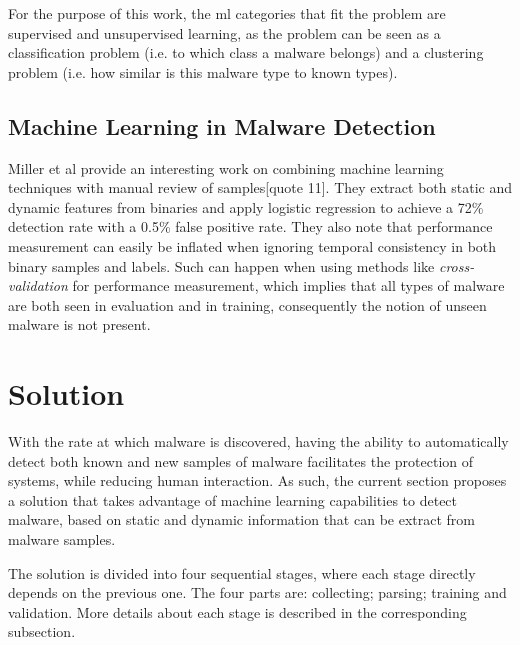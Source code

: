 \documentclass{llncs}
\begin{document}
For the purpose of this work, the \gls{ml} categories that fit the problem are supervised and unsupervised learning, as the problem can be seen as a classification problem (i.e. to which class a malware belongs) and a clustering problem (i.e. how similar is this malware type to known types).

\clearpage

\subsection{Machine Learning in Malware Detection}


Miller et al provide an interesting work on combining machine learning techniques with manual review of samples[quote 11]. They extract both static and dynamic features from binaries and apply logistic regression to achieve a 72\% detection rate with a 0.5\% false positive rate. They also note that performance measurement can easily be inflated when ignoring temporal consistency in both binary samples and labels. Such can happen when using methods like \textit{cross-validation} for performance measurement, which implies that all types of malware are both seen in evaluation and in training, consequently the notion of unseen malware is not present.

% 

\section{Solution}\label{sec:solution}

With the rate at which malware is discovered, having the ability to automatically detect both known and new samples of malware facilitates the protection of systems, while reducing human interaction. As such, the current section proposes a solution that takes advantage of machine learning capabilities to detect malware, based on static and dynamic information that can be extract from malware samples.

The solution is divided into four sequential stages, where each stage directly depends on the previous one. The four parts are: collecting; parsing; training and validation. More details about each stage is described in the corresponding subsection.
\end{document}
